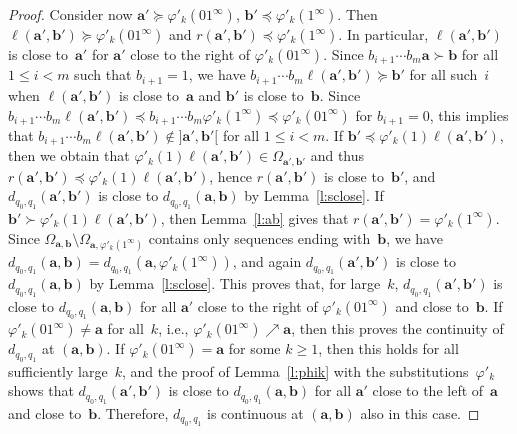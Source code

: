 \documentclass[10pt,a4paper]{amsart}
\newcommand{\ba}{\mathbf{a}}
\newcommand{\bb}{\mathbf{b}}
\begin{document}
\begin{proof}
Consider now $\ba' \succeq \varphi'_k(01^\infty)$, $\bb' \preceq \varphi'_k(1^\infty)$.
Then $\ell(\ba',\bb') \succeq \varphi'_k(01^\infty)$ and $r(\ba',\bb') \preceq \varphi'_k(1^\infty)$.
In particular, $\ell(\ba',\bb')$ is close to~$\ba'$ for $\ba'$ close to the right of $\varphi'_k(01^\infty)$.
Since $b_{i+1} \cdots b_m \ba \succ \bb$ for all $1 \le i < m$ such that $b_{i+1} = 1$, we have $b_{i+1} \cdots b_m \ell(\ba',\bb') \succeq \bb'$ for all such~$i$ when $\ell(\ba',\bb')$ is close to~$\ba$ and $\bb'$ is close to~$\bb$.
Since $b_{i+1} \cdots b_m \ell(\ba',\bb') \preceq b_{i+1} \cdots b_m \varphi'_k(1^\infty) \preceq \varphi'_k(01^\infty)$ for $b_{i+1} = 0$, this implies that $b_{i+1} \cdots b_m \ell(\ba',\bb') \notin {]\ba',\bb'[}$ for all $1 \le i < m$.
If $\bb' \preceq \varphi'_k(1) \ell(\ba',\bb')$, then we obtain that $\varphi'_k(1) \ell(\ba',\bb') \in \Omega_{\ba',\bb'}$ and thus $r(\ba',\bb') \preceq \varphi'_k(1) \ell(\ba',\bb')$, hence $r(\ba',\bb')$ is close to~$\bb'$, and $d_{q_0,q_1}(\ba',\bb')$ is close to $d_{q_0,q_1}(\ba,\bb)$ by Lemma~\ref{l:sclose}.
If $\bb' \succ \varphi'_k(1) \ell(\ba',\bb')$, then Lemma~\ref{l:ab} gives that $r(\ba',\bb') = \varphi'_k(1^\infty)$.
Since $\Omega_{\ba,\bb} \setminus \Omega_{\ba,\varphi'_k(1^\infty)}$ contains only sequences ending with~$\bb$, we have $d_{q_0,q_1}(\ba,\bb) = d_{q_0,q_1}(\ba,\varphi'_k(1^\infty))$, and again $d_{q_0,q_1}(\ba',\bb')$ is close to $d_{q_0,q_1}(\ba,\bb)$ by Lemma~\ref{l:sclose}.
This proves that, for large~$k$, $d_{q_0,q_1}(\ba',\bb')$ is close to $d_{q_0,q_1}(\ba,\bb)$ for all $\ba'$ close to the right of $\varphi'_k(01^\infty)$ and close to~$\bb$.
If $\varphi'_k(01^\infty) \ne \ba$ for all~$k$, i.e., $\varphi'_k(01^\infty) \nearrow \ba$, then this proves the continuity of $d_{q_0,q_1}$ at $(\ba,\bb)$.
If $\varphi'_k(01^\infty) = \ba$ for some $k \ge 1$, then this holds for all sufficiently large~$k$, and the proof of Lemma~\ref{l:phik} with the substitutions~$\varphi'_k$ shows that $d_{q_0,q_1}(\ba',\bb')$ is close to $d_{q_0,q_1}(\ba,\bb)$ for all $\ba'$ close to the left of~$\ba$ and close to~$\bb$.
Therefore, $d_{q_0,q_1}$ is continuous at $(\ba,\bb)$ also in this case.
\end{proof}
\end{document}
